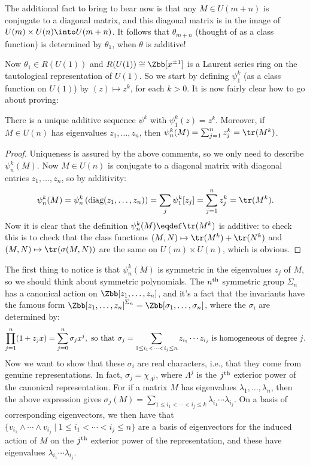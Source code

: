 The additional fact to bring to bear now is that any $M \in U(m+n)$ is conjugate to a diagonal matrix, and this diagonal matrix is in the image of $U(m) \times U(n) \into U(m+n)$.  It follows that $\theta_{m+n}$ (thought of as a class function) is determined by $\theta_1$, when $\theta$ is additive!

Now $\theta_1 \in R(U(1))$ and $R(U(1)) \cong \Zbb[x^{\pm 1}]$ is a Laurent series ring on the tautological representation of $U(1)$.  So we start by defining $\psi_1^k$ (as a class function on $U(1)$) by $(z)\mapsto z^k$, for each $k > 0$.  It is now fairly clear how to go about proving:
\begin{thm}
There is a unique additive sequence $\psi^k$ with $\psi^k_1(z) = z^k$. Moreover, if $M\in U(n)$ has eigenvalues $z_1,\ldots,z_n$, then $\psi_n^k(M)=\sum_{j=1}^n z^k_j=\tr(M^k)$.
\end{thm}
\begin{proof}
Uniqueness is assured by the above comments, so we only need to describe $\psi_n^k(M)$. Now $M \in U(n)$ is conjugate to a diagonal matrix with diagonal entries $z_1, \ldots, z_n$, so by additivity:
\[\psi^k_n(M) = \psi^k_n \left( \textup{diag}(z_1,\ldots,z_n)\right) = \sum_j \psi^k_1 [z_j] = \sum_{j=1}^n z_j^k = \tr(M^k).\]
Now it is clear that the definition $\psi^k_n(M) \eqdef \tr(M^k)$ is additive: to check this is to check that the class functions $(M,N)\mapsto \tr(M^k)+\tr(N^k)$ and $(M,N)\mapsto \tr(\sigma(M,N))$ are the same on $U(m)\times U(n)$, which is obvious.
\end{proof}
The first thing to notice is that $\psi^k_n(M)$ is symmetric in the eigenvalues $z_j$ of $M$, so we should think about symmetric polynomials. The $n^\textup{th}$ symmetric group $\Sigma_n$ has a canonical action on $\Zbb[z_1, \ldots, z_n]$, and it's a fact that the invariants have the famous form $\Zbb[z_1, \ldots, z_n]^{\Sigma_n} = \Zbb[\sigma_1, \ldots, \sigma_n]$, where the $\sigma_i$ are determined by:
\[\prod_{j=1}^n (1+z_j x) = \sum_{j=0}^n \sigma_j x^j,\textup{ so that }
\sigma_j = \sum_{ 1\leq i_1 < \cdots < i_j\leq n }z_{i_1}\cdots z_{i_j}\text{ is homogeneous of degree $j$.}\]
Now we want to show that these $\sigma_i$ are real characters, i.e., that they come from genuine representations.  In fact, $\sigma_j = \chi_{\Lambda^j}$, where $\Lambda^j$ is the $j^\textup{th}$ exterior
power of the canonical representation.
For if a matrix $M$ has eigenvalues $\lambda_1, \ldots, \lambda_n$, then the above expression gives $\sigma_j(M) = \sum_{1 \le i_1 < \cdots < i_j \le k} \lambda_{i_1} \cdots \lambda_{i_j}$.  On a basis of corresponding eigenvectors, we then have that $\{v_{i_1} \wedge \cdots \wedge v_{i_j} \mid 1 \le i_1 < \cdots < i_j \le n\}$ are a basis of eigenvectors for the induced action of $M$ on the $j^\textup{th}$ exterior power of the representation, and these have eigenvalues $\lambda_{i_1} \cdots \lambda_{i_j}$.

